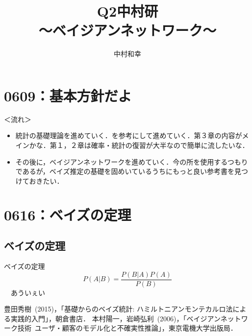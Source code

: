 \documentclass[12pt,fleqn,dvipdfmx]{jarticle}
\begin{document}
  \title{Q2中村研\\〜ベイジアンネットワーク〜}
  \author{中村和幸}
  \date{}
  \maketitle
  \tableofcontents
  \newpage
  \section{0609：基本方針だよ}
  ＜流れ＞
  \begin{itemize}
    \item 統計の基礎理論を進めていく．\cite{toyoda}を参考にして進めていく．第３章の内容がメインかな．第１，２章は確率・統計の復習が大半なので簡単に流したいな．
    \item その後に，ベイジアンネットワークを進めていく．今の所\cite{motomura}を使用するつもりであるが，ベイズ推定の基礎を固めいているうちにもっと良い参考書を見つけておきたい．
  \end{itemize}

  \section{0616：ベイズの定理}
  \subsection{ベイズの定理}
  ベイズの定理
  \begin{equation}
      P(A|B)=\frac{P(B|A)P(A)}{P(B)}
  \end{equation}
  　あういぇい

  \newpage
  \begin{thebibliography}{99}
  豊田秀樹\ (2015)，「基礎からのベイズ統計: ハミルトニアンモンテカルロ法による実践的入門」，朝倉書店．
  本村陽一，岩崎弘利\ (2006)，「ベイジアンネットワーク技術\ ユーザ・顧客のモデル化と不確実性推論」，東京電機大学出版局．
  \end{thebibliography}

  
\end{document}
